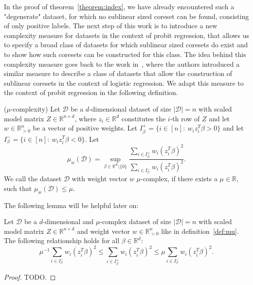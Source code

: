 In the proof of theorem~\ref{theorem:index}, we have already encountered
such a "degenerate" dataset, for which no sublinear sized coreset can be found,
consisting of only positive labels.
The next step of this work is to introduce a new complexity measure
for datasets in the context of probit regression, that allows us
to specify a broad class of datasets for which sublinear sized
coresets do exist and to show how such coresets can be constructed
for this class.
The idea behind this complexity measure goes back to
the work in~\cite{on-coresets}, where the authors introduced a similar
measure to describe a class of datasets that allow the construction
of sublinear coresets in the context of logistic regression.
We adapt this measure to the context of probit regression in the
following definition.

\begin{definition}($\mu$-complexity)
    \label{def:mu}
    Let $\mathcal{D}$ be a $d$-dimensional dataset of size
    $|\mathcal{D}|=n$ with scaled
    model matrix $Z \in \mathbb{R}^{n \times d}$, where
    $z_i \in \mathbb{R}^d$ constitutes the $i$-th
    row of $Z$ and let
    $w \in \mathbb{R}^n_{>0}$ be a vector of positive weights.
    Let $I_\beta^+ = \{i \in [n]:\ w_i z_i^T \beta > 0 \}$
    and let $I_\beta^- = \{i \in [n]:\ w_i z_i^T \beta < 0 \}$.
    Let
    \begin{equation*}
        \mu_w(\mathcal{D}) = \sup_{\beta \in \mathbb{R}^d \setminus \{0\}}
        \frac{\sum_{i \in I_\beta^+} w_i (z_i^T \beta)^2}
        {\sum_{i \in I_\beta^-} w_i (z_i^T \beta)^2}.
    \end{equation*}
    We call the dataset $\mathcal{D}$ with weight vector $w$
    $\mu$-complex, if there exists a $\mu \in \mathbb{R}$,
    such that $\mu_w(\mathcal{D}) \leq \mu$.
\end{definition}

The following lemma will be helpful later on:
\begin{lemma}
    \label{lemma:mu-inequalities}
    Let $\mathcal{D}$ be a $d$-dimensional and $\mu$-complex dataset of size
    $|\mathcal{D}|=n$ with scaled
    model matrix $Z \in \mathbb{R}^{n \times d}$ and weight
    vector $w \in \mathbb{R}^n_{>0}$ like in
    definition~\ref{def:mu}.
    The following relationship holds for all $\beta \in \mathbb{R}^d$:
    \begin{equation*}
        \mu^{-1} \sum_{i \in I_\beta^-} w_i (z_i^T \beta)^2
        \leq \sum_{i \in I_\beta^+} w_i (z_i^T \beta)^2
        \leq \mu \sum_{i \in I_\beta^-} w_i (z_i^T \beta)^2.
    \end{equation*}
\end{lemma}
\begin{proof}
    TODO.
\end{proof}


